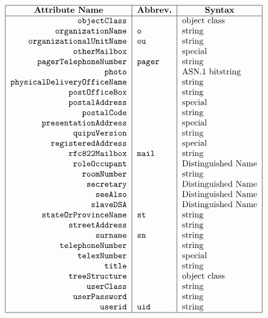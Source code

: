 
\smaller

\[\begin{tabular}{|r|l|l|}
\hline
\multicolumn{1}{|c|}{\bf Attribute Name}&
	\multicolumn{1}{c|}{\bf Abbrev.}&
			\multicolumn{1}{c|}{\bf Syntax}\\
\hline
\verb"objectClass"&&object class\\
\verb"organizationName"&\verb"o"&string\\
\verb"organizationalUnitName"&\verb"ou"&string\\
\verb"otherMailbox"&&special\\
\verb"pagerTelephoneNumber"&\verb"pager"&string\\
\verb"photo"&&ASN.1 bitstring\\
\verb"physicalDeliveryOfficeName"&&string\\
\verb"postOfficeBox"&&string\\
\verb"postalAddress"&&special\\
\verb"postalCode"&&string\\
\verb"presentationAddress"&&special\\
\verb"quipuVersion"&&string\\
\verb"registeredAddress"&&special\\
\verb"rfc822Mailbox"&\verb"mail"&string\\
\verb"roleOccupant"&&Distinguished Name\\
\verb"roomNumber"&&string\\
\verb"secretary"&&Distinguished Name\\
\verb"seeAlso"&&Distinguished Name\\
\verb"slaveDSA"&&Distinguished Name\\
\verb"stateOrProvinceName"&\verb"st"&string\\
\verb"streetAddress"&&string\\
\verb"surname"&\verb"sn"&string\\
\verb"telephoneNumber"&&string\\
\verb"telexNumber"&&special\\
\verb"title"&&string\\
\verb"treeStructure"&&object class\\
\verb"userClass"&&string\\
\verb"userPassword"&&string\\
\verb"userid"&\verb"uid"&string\\
\hline
\end{tabular}\]

